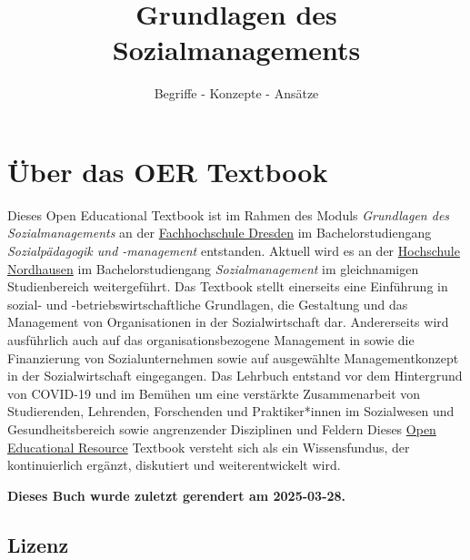 \documentclass[
  letterpaper,
]{book}
\title{Grundlagen des Sozialmanagements}
\subtitle{Begriffe - Konzepte - Ansätze}
\author{}
\date{}
\renewcommand*\contentsname{Table of contents}
\newcommand\contentsname{Table of contents}
\begin{document}
\frontmatter
\maketitle

\renewcommand*\contentsname{Table of contents}
{
\hypersetup{linkcolor=}
\setcounter{tocdepth}{2}
\tableofcontents
}

\mainmatter
{}

\chapter*{Über das OER Textbook}\label{uxfcber-das-oer-textbook}


Dieses Open Educational Textbook ist im Rahmen des Moduls
\emph{Grundlagen des Sozialmanagements} an der
\href{https://www.fh-dresden.de}{Fachhochschule Dresden} im
Bachelorstudiengang \emph{Sozialpädagogik und -management} entstanden.
Aktuell wird es an der \href{https://www.hs-nordhausen.de}{Hochschule
Nordhausen} im Bachelorstudiengang \emph{Sozialmanagement} im
gleichnamigen Studienbereich weitergeführt. Das Textbook stellt
einerseits eine Einführung in sozial- und -betriebswirtschaftliche
Grundlagen, die Gestaltung und das Management von Organisationen in der
Sozialwirtschaft dar. Andererseits wird ausführlich auch auf das
organisationsbezogene Management in sowie die Finanzierung von
Sozialunternehmen sowie auf ausgewählte Managementkonzept in der
Sozialwirtschaft eingegangen. Das Lehrbuch entstand vor dem Hintergrund
von COVID-19 und im Bemühen um eine verstärkte Zusammenarbeit von
Studierenden, Lehrenden, Forschenden und Praktiker*innen im Sozialwesen
und Gesundheitsbereich sowie angrenzender Disziplinen und Feldern Dieses
\href{https://de.wikipedia.org/wiki/Open_Educational_Resources}{Open
Educational Resource} Textbook versteht sich als ein Wissensfundus, der
kontinuierlich ergänzt, diskutiert und weiterentwickelt wird.

\textbf{Dieses Buch wurde zuletzt gerendert am 2025-03-28.}

\section*{Lizenz}\label{lizenz}

\end{document}
